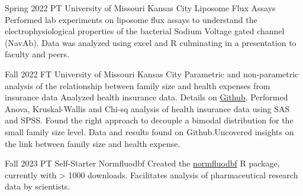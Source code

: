 \documentclass[
	10pt, %
]{FreemanCV}
\begin{document}
\begin{paracol}{2}

\projectentry
	{Spring 2022} %
	{PT} %
	{University of Missouri Kansas City} %
	{Liposome Flux Assays } %
	{Performed lab experiments on liposome flux assays to understand the electrophysiological properties of the bacterial Sodium Voltage gated channel (NavAb).
	Data was analyzed using excel and R culminating in a presentation to faculty and peers.}
	
	 
\projectentry
	{Fall 2022} %
	{FT} %
	{University of Missouri Kansas City} %
	{Parametric and non-parametric analysis of the relationship between family size and health expenses from insurance data} %
	{Analyzed health insurance data. Details on \href{https://github.com/AlphaPrime7/Health_Insurance_Project_SAS}{Github}. Performed Anova, Kruskal-Wallis and Chi-sq analysis of health insurance data using SAS and SPSS. Found the right approach to decouple a bimodal distribution for the small family size level. Data and results
found on Github.Uncovered insights on the link between family size and health expense.}


\projectentry
	{Fall 2023} %
	{PT} %
	{Self-Starter} %
	{Normfluodbf} %
	{Created the \href{https://www.cran-e.com/package/normfluodbf}{normfluodbf} R package, currently with > 1000 downloads. Facilitates analysis of pharmaceutical research data by scientists.}







\switchcolumn %



\end{paracol}
\end{document}
